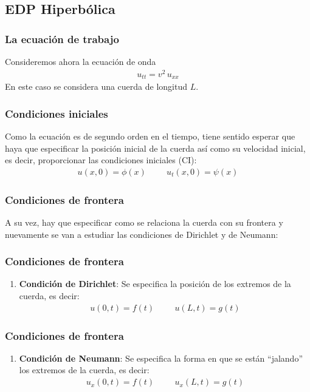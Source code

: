 \documentclass[12pt]{beamer}
\begin{document}
\subsection{EDP Hiperbólica}

\begin{frame}
\frametitle{La ecuación de trabajo}
Consideremos ahora la ecuación de onda
\begin{align*}
u_{tt} = v^{2} \, u_{xx}
\end{align*}
En este caso se considera una cuerda de longitud $L$. 
\end{frame}
\begin{frame}
\frametitle{Condiciones iniciales}
Como la ecuación es de segundo orden en el tiempo, tiene sentido esperar que haya que especificar la posición inicial de la cuerda así como su velocidad inicial, es decir, proporcionar las condiciones iniciales (CI):
\begin{align}
u(x, 0) = \phi (x) \hspace{1cm} u_{t}(x, 0) = \psi (x)
\label{eq:ecuacion_06_02_07}
\end{align}
\end{frame}
\begin{frame}
\frametitle{Condiciones de frontera}
A su vez, hay que especificar como se relaciona la cuerda con su frontera y nuevamente se van a estudiar las condiciones de Dirichlet y de Neumann:
\end{frame}
\begin{frame}
\frametitle{Condiciones de frontera}
\begin{enumerate}
\item \textbf{Condición de Dirichlet}: Se especifica la posición de los extremos de la cuerda, es decir:
\begin{align}
u(0, t) = f (t) \hspace{1cm} u(L, t) = g(t)
\label{eq:ecuacion_06_02_08}   
\end{align}
\seti
\end{enumerate}
\end{frame}
\begin{frame}
\frametitle{Condiciones de frontera}
\begin{enumerate}
\conti
\item \textbf{Condición de Neumann}: Se especifica la forma en que se están \enquote{jalando} los extremos de la cuerda, es decir:
\begin{align}
u_{x}(0, t) = f(t) \hspace{1cm} u_{x}(L,t) = g(t)
\label{eq:ecuacion_06_02_09}    
\end{align}
\end{enumerate}
\end{frame}
\end{document}
